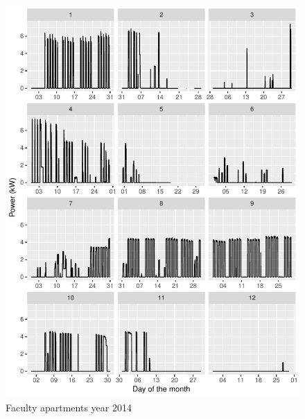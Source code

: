 \documentclass[11pt, oneside]{article}   	%
\begin{document}
\begin{figure}
\includegraphics[keepaspectratio]{fac_build_Y2014.pdf}
\caption{Faculty apartments  year 2014}
\end{figure}
\end{document}
